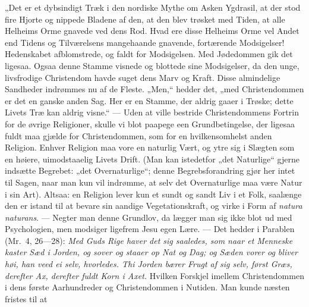 \documentclass[12pt,a4paper]{book}
\begin{document}
„Det er et dybsindigt Træk i den nordiske Mythe om Asken Ygdrasil, at der stod
fire Hjorte og nippede Bladene af den, at den blev trøsket med Tiden, at alle
Helheims Orme gnavede ved dens Rod. Hvad ere disse Helheims Orme vel Andet end
Tidens og Tilværelsens mangehaande gnavende, fortærende Modsigelser!
Hedenskabet afblomstrede, og faldt for Modsigelsen. Med Jødedommen gik det
ligesaa. Ogsaa denne Stamme visnede og blottede sine Modsigelser, da den unge,
livsfrodige Christendom havde suget dens Marv og Kraft. Disse almindelige
Sandheder indrømmes nu af de Fleste. „Men,“ hedder det, „med Christendommen er
det en ganske anden Sag. Her er en Stamme, der aldrig gaaer i Trøske; dette
Livets Træ kan aldrig visne.“ --- Uden at ville bestride Christendommens Fortrin
for de øvrige Religioner, skulle vi blot paapege een Grundbetingelse, der ligesaa
fuldt maa gjælde for Christendommen, som for en hvilkensomhelst anden Religion.
Enhver Religion maa vore en naturlig Vært, og ytre sig i Slægten som en høiere,
uimodstaaelig Livets Drift. (Man kan
istedetfor „det Naturlige“ gjerne indsætte Begrebet: „det Overnaturlige“; denne
Begrebsforandring gjør her intet til Sagen, naar man kun vil indrømme, at selv
det Overnaturlige maa være Natur i sin Art). Altsaa: en Religion lever kun et
sundt og sandt Liv i et Folk, saalænge den er istand til at bevare sin aandige
Vegetationskraft, og virke i Form af
\textit{natura naturans}. --- Negter man denne Grundlov, da lægger man sig ikke
blot ud med Psychologien, men modsiger ligefrem Jesu egen Lære. --- Det hedder i
Parablen (Mr.\ 4, 26---28):
\emph{Med Guds Rige haver det sig saaledes, som naar et Menneske kaster Sæd i
Jorden, og sover og staaer op Nat og Dag; og Sæden vorer og bliver høi, han veed
ei selv, hvorledes. Thi Jorden bærer Frugt af sig selv, først Græs, derefter Ax,
derefter fuldt Korn i Axet.} Hvilken Forskjel imellem Christendommen i dens
første Aarhundreder og Christendommen i Nutiden. Man kunde næsten fristes til at
\end{document}
